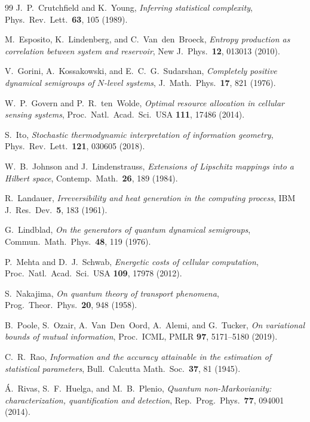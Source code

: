 \documentclass[12pt,a4paper,openany]{book}
\begin{document}
\begin{thebibliography}{99}
J.~P.~Crutchfield and K.~Young,
\emph{Inferring statistical complexity},
Phys.\ Rev.\ Lett.\ \textbf{63}, 105 (1989).

M.~Esposito, K.~Lindenberg, and C.~Van~den~Broeck,
\emph{Entropy production as correlation between system and reservoir},
New J.\ Phys.\ \textbf{12}, 013013 (2010).

V.~Gorini, A.~Kossakowski, and E.~C.~G.~Sudarshan,
\emph{Completely positive dynamical semigroups of $N$-level systems},
J.\ Math.\ Phys.\ \textbf{17}, 821 (1976).

W.~P.~Govern and P.~R.~ten~Wolde,
\emph{Optimal resource allocation in cellular sensing systems},
Proc.\ Natl.\ Acad.\ Sci.\ USA \textbf{111}, 17486 (2014).

S.~Ito,
\emph{Stochastic thermodynamic interpretation of
information geometry},
Phys.\ Rev.\ Lett.\ \textbf{121}, 030605 (2018).

W.~B.~Johnson and J.~Lindenstrauss,
\emph{Extensions of Lipschitz mappings into a Hilbert space},
Contemp.\ Math.\ \textbf{26}, 189 (1984).

R.~Landauer,
\emph{Irreversibility and heat generation in the computing process},
IBM J.\ Res.\ Dev.\ \textbf{5}, 183 (1961).

G.~Lindblad,
\emph{On the generators of quantum dynamical semigroups},
Commun.\ Math.\ Phys.\ \textbf{48}, 119 (1976).

P.~Mehta and D.~J.~Schwab,
\emph{Energetic costs of cellular computation},
Proc.\ Natl.\ Acad.\ Sci.\ USA \textbf{109}, 17978 (2012).

S.~Nakajima,
\emph{On quantum theory of transport phenomena},
Prog.\ Theor.\ Phys.\ \textbf{20}, 948 (1958).

B.~Poole, S.~Ozair, A.~Van~Den~Oord, A.~Alemi, and G.~Tucker,
\emph{On variational bounds of mutual information},
Proc.\ ICML, PMLR \textbf{97}, 5171--5180 (2019).

C.~R.~Rao,
\emph{Information and the accuracy attainable in the
estimation of statistical parameters},
Bull.\ Calcutta Math.\ Soc.\ \textbf{37}, 81 (1945).

\'{A}.~Rivas, S.~F.~Huelga, and M.~B.~Plenio,
\emph{Quantum non-Markovianity: characterization, quantification and detection},
Rep.\ Prog.\ Phys.\ \textbf{77}, 094001 (2014).


\end{thebibliography}
\end{document}
